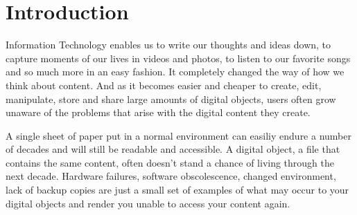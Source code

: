 
\section{Introduction}
Information Technology enables us to write our thoughts and ideas down, to capture moments of our lives in videos and photos, to listen to our favorite songs and so much more in an easy fashion. It completely changed the way of how we think about content. And as it becomes easier and cheaper to create, edit, manipulate, store and share large amounts of digital objects, users often grow unaware of the problems that arise with the digital content they create.

A single sheet of paper put in a normal environment can easiliy endure a number of decades and will still be readable and accessible. A digital object, a file that contains the same content, often doesn't stand a chance of living through the next decade. Hardware failures, software obscolescence, changed environment, lack of backup copies are just a small set of examples of what may occur to your digital objects and render you unable to access your content again.

